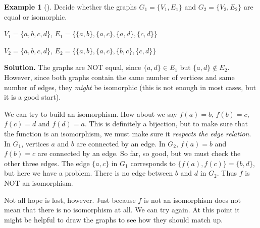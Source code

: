 \documentclass[12pt,]{book}
\theoremstyle{plain}
\theoremstyle{definition}
\theoremstyle{definition}
\newtheorem{example}[theorem]{Example}
\theoremstyle{definition}
\numberwithin{equation}{chapter}
\newlength{\panelmax}
\begin{document}
\begin{example}[]\label{example-77}
\hypertarget{p-1530}{}%
Decide whether the graphs \(G_1 = \{V_1, E_1\}\) and \(G_2 = \{V_2, E_2\}\) are equal or isomorphic.%
\par
\hypertarget{p-1531}{}%
\(V_1 = \{a,b,c,d\}\), \(E_1 = \{\{a,b\}, \{a,c\}, \{a,d\}, \{c,d\}\}\)%
\par
\hypertarget{p-1532}{}%
\(V_2 = \{a,b,c,d\}\), \(E_2 = \{\{a,b\}, \{a,c\}, \{b,c\}, \{c,d\}\}\)%
\par\smallskip%
\noindent\textbf{Solution.}\hypertarget{solution-160}{}\quad%
\hypertarget{p-1533}{}%
The graphs are NOT equal, since \(\{a,d\} \in E_1\) but \(\{a,d\} \notin E_2\). However, since both graphs contain the same number of vertices and same number of edges, they \emph{might} be isomorphic (this is not enough in most cases, but it is a good start).%
\par
\hypertarget{p-1534}{}%
We can try to build an isomorphism. How about we say \(f(a) = b\), \(f(b) = c\), \(f(c) = d\) and \(f(d) = a\). This is definitely a bijection, but to make sure that the function is an isomorphism, we must make sure it \emph{respects the edge relation}. In \(G_1\), vertices \(a\) and \(b\) are connected by an edge. In \(G_2\), \(f(a) = b\) and \(f(b) = c\) are connected by an edge. So far, so good, but we must check the other three edges. The edge \(\{a,c\}\) in \(G_1\) corresponds to \(\{f(a), f(c)\} = \{b,d\}\), but here we have a problem. There is no edge between \(b\) and \(d\) in \(G_2\). Thus \(f\) is NOT an isomorphism.%
\par
\hypertarget{p-1535}{}%
Not all hope is lost, however. Just because \(f\) is not an isomorphism does not mean that there is no isomorphism at all. We can try again. At this point it might be helpful to draw the graphs to see how they should match up.%
{%
\setlength{\panelmax}{0pt}
\ifdefined\panelboxAimage\else\newsavebox{\panelboxAimage}\fi%
\begin{lrbox}{\panelboxAimage}
\end{lrbox}}
\end{example}
\end{document}

